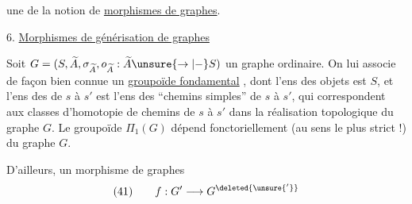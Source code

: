 une  de la notion de \uline{morphismes de graphes}.

\qquad{}

6. \uline{Morphismes de générisation de graphes }

Soit $G=(S,\widetilde A,\sigma_{\widetilde A},o_{\widetilde A}:\widetilde A\unsure{\to|{-}}S)$ un graphe ordinaire. On lui associe de façon bien connue un \uline{groupoïde fondamental} , dont l'ens des objets est $S$, et l'ens des  de $s$ à $s'$ est l'ens des ``chemins simples'' de $s$ à $s'$, qui correspondent aux classes d'homotopie de chemins de $s$ à $s'$ dans la réalisation topologique du graphe $G$. Le groupoïde $\Pi_1(G)$ dépend fonctoriellement (au sens le plus strict !) du graphe $G$.

D'ailleurs, un morphisme de graphes
\[
(41)\qquad f:G'\longrightarrow G^{\deleted{\unsure{'}}}
\]
